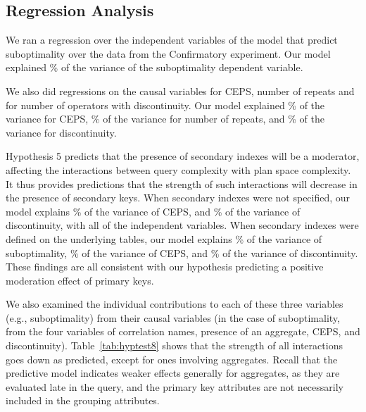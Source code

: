 \documentclass[prodmode,acmtods]{acmsmall}
\begin{document}
\subsection{Regression Analysis}
We ran a regression over the independent variables of the
model that predict suboptimality over the data from the Confirmatory experiment. 
Our model explained \% of the variance of the suboptimality dependent
variable.

We also did regressions on the causal variables for CEPS, number of repeats and for number of
operators with discontinuity. Our model explained \% of the
variance for CEPS, \% of the variance for number of repeats, and \% of the variance for
discontinuity.  

Hypothesis 5 predicts that the presence of secondary indexes will be a moderator,
affecting the interactions between query complexity with plan space
complexity. It thus provides
predictions that the strength of such interactions will decrease in the
presence of secondary keys. When
secondary indexes were not specified, our model explains 
 \% of the variance of CEPS, and \% of the variance
of discontinuity, with all of the independent variables. When
secondary indexes were defined on the underlying tables, our model explains
\% of the variance of suboptimality, \% of the variance of CEPS, and
\% of the variance of discontinuity. These findings are all consistent with our
hypothesis predicting a positive moderation effect of primary keys.

We also examined the individual contributions to each of these
three variables (e.g., suboptimality) from their causal variables (in the
case of suboptimality, from the four variables of correlation names, presence
of an aggregate, CEPS, and discontinuity). 
Table~\ref{tab:hyptest8} shows that the strength of all interactions goes
down as predicted, except for ones involving aggregates. Recall
that the predictive model indicates weaker effects generally for aggregates,
as they are evaluated late in the query, and the primary key attributes are
not necessarily included in the grouping attributes.
\end{document}
